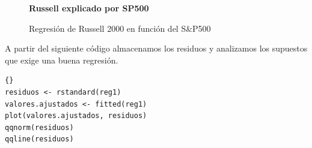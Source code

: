 \begin{figure}[H]
	\centering
	\textbf{Russell explicado por SP500}\par\medskip
	\caption{Regresión de Russell 2000 en función del S\&P500}
\end{figure}



\pagebreak A partir del siguiente c\'odigo almacenamos los residuos y analizamos los supuestos que exige una buena regresi\'on.
\begin{lstlisting}[title={‘Código R para Residuos de regresión’},basicstyle=\ttfamily]{}
residuos <- rstandard(reg1)
valores.ajustados <- fitted(reg1)
plot(valores.ajustados, residuos)
qqnorm(residuos)
qqline(residuos)
\end{lstlisting}\label{ejemplo3ResiduosRegresion}



